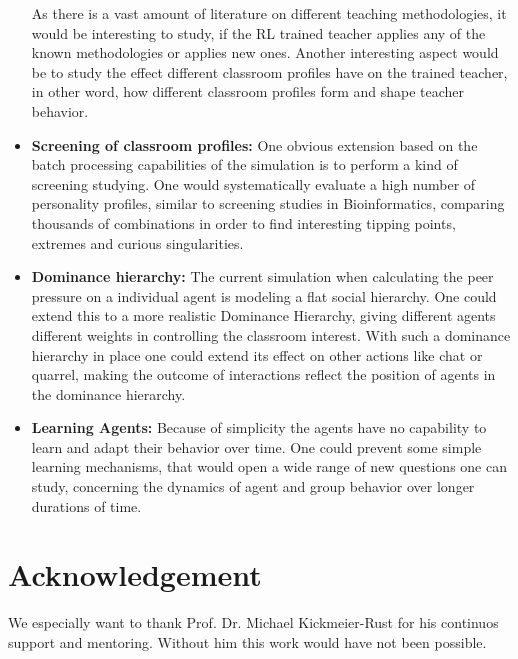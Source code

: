 \begin{itemize}
    \bb

    As there is a vast amount of literature on different teaching methodologies,
    it would be interesting to study, if the RL trained teacher applies any of the known
    methodologies or applies new ones. Another interesting aspect would be to study the
    effect different classroom profiles have on the trained teacher, in other
    word, how different classroom profiles form and shape teacher behavior.

    \item \textbf{Screening of classroom profiles:} One obvious extension based
    on the batch processing capabilities of the simulation is to perform a kind
    of screening studying. One would systematically evaluate a high number of personality
    profiles, similar to screening studies in Bioinformatics, comparing thousands
    of combinations in order to find interesting tipping points, extremes and curious
    singularities.

    \item \textbf{Dominance hierarchy:} The current simulation when calculating
    the peer pressure on a individual agent is modeling a flat social hierarchy.
    One could extend this to a more realistic Dominance Hierarchy, giving different
    agents different weights in controlling the classroom interest. With such a dominance
    hierarchy in place one could extend its effect on other actions like chat or
    quarrel, making the outcome of interactions reflect the position
    of agents in the dominance hierarchy.

    \item \textbf{Learning Agents:} Because of simplicity the agents have no capability
    to learn and adapt their behavior over time. One could prevent some simple learning
    mechanisms, that would open a wide range of new questions one can study, concerning
    the dynamics of agent and group behavior over longer durations of time.
\end{itemize}

\section{Acknowledgement}
We especially want to thank Prof. Dr. Michael Kickmeier-Rust for his continuos
support and mentoring. Without him this work would have not been possible.
